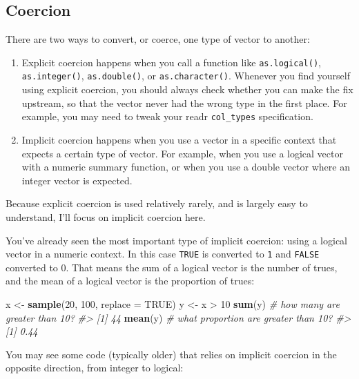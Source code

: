 \documentclass[]{book}
\newenvironment{Shaded}{\begin{snugshade}}{\end{snugshade}}
\newcommand{\KeywordTok}[1]{\textcolor[rgb]{0.13,0.29,0.53}{\textbf{{#1}}}}
\newcommand{\DataTypeTok}[1]{\textcolor[rgb]{0.13,0.29,0.53}{{#1}}}
\newcommand{\DecValTok}[1]{\textcolor[rgb]{0.00,0.00,0.81}{{#1}}}
\newcommand{\StringTok}[1]{\textcolor[rgb]{0.31,0.60,0.02}{{#1}}}
\newcommand{\CommentTok}[1]{\textcolor[rgb]{0.56,0.35,0.01}{\textit{{#1}}}}
\newcommand{\OtherTok}[1]{\textcolor[rgb]{0.56,0.35,0.01}{{#1}}}
\newcommand{\NormalTok}[1]{{#1}}
\begin{document}
\subsection{Coercion}\label{coercion}

There are two ways to convert, or coerce, one type of vector to another:

\begin{enumerate}
\def\labelenumi{\arabic{enumi}.}
\item
  Explicit coercion happens when you call a function like
  \texttt{as.logical()}, \texttt{as.integer()}, \texttt{as.double()}, or
  \texttt{as.character()}. Whenever you find yourself using explicit
  coercion, you should always check whether you can make the fix
  upstream, so that the vector never had the wrong type in the first
  place. For example, you may need to tweak your readr
  \texttt{col\_types} specification.
\item
  Implicit coercion happens when you use a vector in a specific context
  that expects a certain type of vector. For example, when you use a
  logical vector with a numeric summary function, or when you use a
  double vector where an integer vector is expected.
\end{enumerate}

Because explicit coercion is used relatively rarely, and is largely easy
to understand, I'll focus on implicit coercion here.

You've already seen the most important type of implicit coercion: using
a logical vector in a numeric context. In this case \texttt{TRUE} is
converted to \texttt{1} and \texttt{FALSE} converted to 0. That means
the sum of a logical vector is the number of trues, and the mean of a
logical vector is the proportion of trues:

\begin{Shaded}
\begin{Highlighting}[]
\NormalTok{x <-}\StringTok{ }\KeywordTok{sample}\NormalTok{(}\DecValTok{20}\NormalTok{, }\DecValTok{100}\NormalTok{, }\DataTypeTok{replace =} \OtherTok{TRUE}\NormalTok{)}
\NormalTok{y <-}\StringTok{ }\NormalTok{x >}\StringTok{ }\DecValTok{10}
\KeywordTok{sum}\NormalTok{(y)  }\CommentTok{# how many are greater than 10?}
\CommentTok{#> [1] 44}
\KeywordTok{mean}\NormalTok{(y) }\CommentTok{# what proportion are greater than 10?}
\CommentTok{#> [1] 0.44}
\end{Highlighting}
\end{Shaded}

You may see some code (typically older) that relies on implicit coercion
in the opposite direction, from integer to logical:
\end{document}
